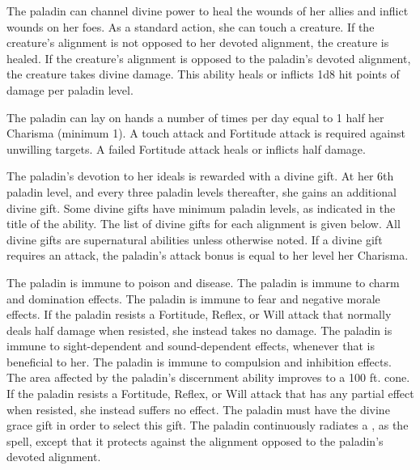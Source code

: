  The paladin can channel divine power to heal the wounds of her allies and inflict wounds on her foes. As a standard action, she can touch a creature. If the creature's alignment is not opposed to her devoted alignment, the creature is healed. If the creature's alignment is opposed to the paladin's devoted alignment, the creature takes divine damage. This ability heals or inflicts 1d8 hit points of damage per paladin level.

The paladin can lay on hands a number of times per day equal to 1 \add half her Charisma (minimum 1). A touch attack and Fortitude attack is required against unwilling targets. A failed Fortitude attack heals or inflicts half damage.

 The paladin's devotion to her ideals is rewarded with a divine gift. At her 6th paladin level, and every three paladin levels thereafter, she gains an additional divine gift. Some divine gifts have minimum paladin levels, as indicated in the title of the ability. The list of divine gifts for each alignment is given below. All divine gifts are supernatural abilities unless otherwise noted. If a divine gift requires an attack, the paladin's attack bonus is equal to her level \add her Charisma.

 The paladin is immune to poison and disease.
 The paladin is immune to charm and domination effects.
 The paladin is immune to fear and negative morale effects.
 If the paladin resists a Fortitude, Reflex, or Will attack that normally deals half damage when resisted, she instead takes no damage.
 The paladin is immune to sight-dependent and sound-dependent effects, whenever that is beneficial to her.
 The paladin is immune to compulsion and inhibition effects.
 The area affected by the paladin's discernment ability improves to a 100 ft. cone.
 If the paladin resists a Fortitude, Reflex, or Will attack that has any partial effect when resisted, she instead suffers no effect. The paladin must have the divine grace gift in order to select this gift.
 The paladin continuously radiates a , as the spell, except that it protects against the alignment opposed to the paladin's devoted alignment.

